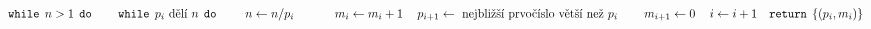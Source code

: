\documentclass[preview]{standalone}
\begin{document}
\begin{align*}
&\mathtt{while} \:\: n > 1 \:\: \mathtt{do} &\hspace*{12pt}\mathtt{while} \:\: p_i \text{ dělí } n \:\: \mathtt{do} &\hspace*{24pt}n \leftarrow n / p_i &\hspace*{24pt}m_i \leftarrow m_i + 1 &\hspace*{12pt}p_{i+1} \leftarrow \text{ nejbližší prvočíslo větší než } p_i &\hspace*{12pt}m_{i+1} \leftarrow 0 &\hspace*{12pt}i \leftarrow i + 1 &\mathtt{return} \:\: \{(p_i, m_i)\}
\end{align*}
\end{document}
